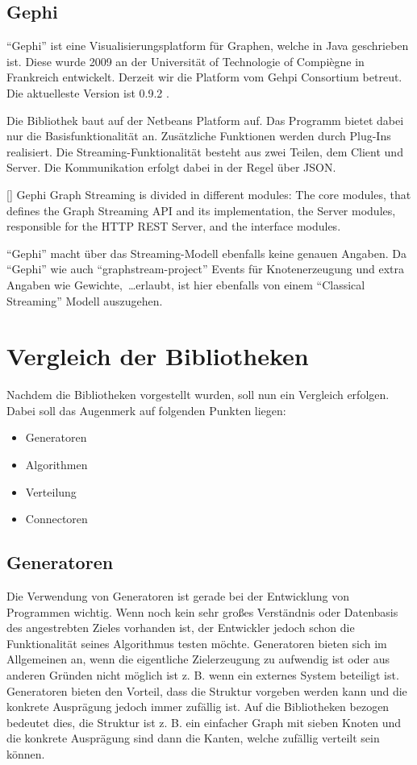 \subsection{Gephi}
\enquote{Gephi} ist eine Visualisierungsplatform für Graphen, welche in Java
geschrieben ist. Diese wurde 2009 an der Universität of Technologie of Compiègne
in Frankreich entwickelt. Derzeit wir die Platform vom Gehpi Consortium betreut.
Die aktuelleste Version ist 0.9.2 .

Die Bibliothek baut auf der Netbeans Platform auf. Das Programm bietet dabei nur
die Basisfunktionalität an. Zusätzliche Funktionen werden durch Plug-Ins
realisiert. Die Streaming-Funktionalität besteht aus zwei Teilen, dem Client und
Server. Die Kommunikation erfolgt dabei in der Regel über \gls{JSON}.

[\cite{Bastian2009}]{
Gephi Graph Streaming is divided in different modules: The core modules, that
defines the Graph Streaming API and its implementation, the Server modules,
responsible for the HTTP REST Server, and the interface modules. 
}

\enquote{Gephi} macht über das Streaming-Modell ebenfalls keine genauen Angaben.
Da \enquote{Gephi} wie auch \enquote{graphstream-project} Events für
Knotenerzeugung und extra Angaben wie Gewichte,~\dots erlaubt, ist hier
ebenfalls von einem \enquote{Classical Streaming} Modell auszugehen.

\section{Vergleich der Bibliotheken}
Nachdem die Bibliotheken vorgestellt wurden, soll nun ein Vergleich erfolgen.
Dabei soll das Augenmerk auf folgenden Punkten liegen:

\begin{itemize}
\item Generatoren
\item Algorithmen
\item Verteilung
\item Connectoren
\end{itemize}

\subsection{Generatoren}
Die Verwendung von Generatoren ist gerade bei der Entwicklung von Programmen
wichtig. Wenn noch kein sehr großes Verständnis oder Datenbasis des angestrebten
Zieles vorhanden ist, der Entwickler jedoch schon die Funktionalität seines
Algorithmus testen möchte. Generatoren bieten sich im Allgemeinen an, wenn die
eigentliche Zielerzeugung zu aufwendig ist oder aus anderen Gründen nicht möglich
ist z. B. wenn ein externes System beteiligt ist. Generatoren bieten den
Vorteil, dass die Struktur vorgeben werden kann und die konkrete Ausprägung jedoch
immer zufällig ist. Auf die Bibliotheken bezogen bedeutet dies, die Struktur ist
z. B. ein einfacher Graph mit sieben Knoten und die konkrete Ausprägung sind dann
die Kanten, welche zufällig verteilt sein können.

